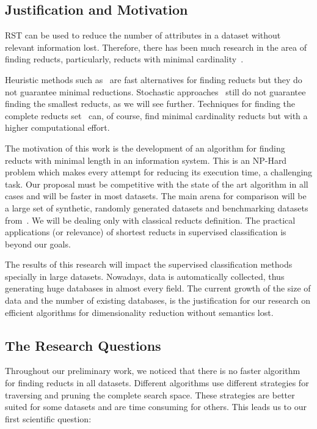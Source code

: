 \documentclass[authoryear,11pt]{elsarticle}
\begin{document}
\subsection{Justification and Motivation}\label{Justification}{
  RST can be used to reduce the number of attributes in a dataset without relevant information lost. 
  Therefore, there has been much research in the area of finding reducts, particularly, reducts with 
  minimal cardinality~\citep{Jensen14}. 
  
  Heuristic methods such as~\citep{Chouchoulas01,Jensen2004,Zhong01} are fast alternatives for finding 
  reducts but they do not guarantee minimal reductions. Stochastic approaches~\citep{Wroblewski95,Jensen03,
  Chen10,Wang07} still do not guarantee finding the smallest reducts, as we will see further. Techniques 
  for finding the complete reducts set~\citep{Ruiz85,Santiesteban03,Sanchez07,Lias09} can, of course, find 
  minimal cardinality reducts but with a higher computational effort.
  
  The motivation of this work is the development of an algorithm for finding reducts with minimal length 
  in an information system. This is an NP-Hard problem which makes every attempt for reducing its execution
  time, a challenging task. Our proposal must be competitive with the state of the art algorithm in all 
  cases and will be faster in most datasets. The main arena for comparison will be a large set of synthetic,
  randomly generated datasets and benchmarking datasets from~\citep{Bache13}. We will be dealing only with
  classical reducts definition. The practical applications (or relevance) of shortest reducts in supervised
  classification is beyond our goals.
  
  The results of this research will impact the supervised classification methods specially in large datasets.
  Nowadays, data is automatically collected, thus generating huge databases in almost every field. The 
  current growth of the size of data and the number of existing databases, is the justification for our
  research on efficient algorithms for dimensionality reduction without semantics lost.}  
  
\subsection{The Research Questions}\label{ResearchQuestions} 
  Throughout our preliminary work, we noticed that there is no faster algorithm for finding reducts in 
  all datasets. Different algorithms use different strategies for traversing and pruning the complete search 
  space. These strategies are better suited for some datasets and are time consuming for others. This leads 
  us to our first scientific question:
  
\end{document}
